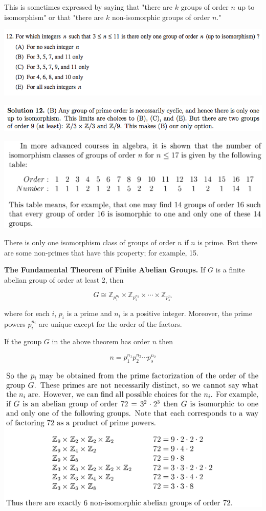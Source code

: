 \documentclass{article}
\begin{document}
This is sometimes expressed by saying that "there are \(k\) groups of order \(n\) up to isomorphism" or that "there are \(k\) non-isomorphic groups of order \(n\)."

\includegraphics[scale=0.65]{1268_12}

\includegraphics[scale=0.65]{1268_12s}

\includegraphics[scale=0.45]{isomorphism_groups_order}

There is only one isomorphism class of groups of order \(n\) if \(n\) is prime. But there are some non-primes that have this property; for example, 15.

\textbf{The Fundamental Theorem of Finite Abelian Groups.} If \(G\) is a finite abelian group of order at least 2, then 

\[
G \cong \mathbb{Z}_{p_1^{n_1}} \times \mathbb{Z}_{p_2^{n_2}} \times \cdots \times \mathbb{Z}_{p_s^{n_s}} 
\]

where for each \(i\), \(p_i\) is a prime and \(n_i\) is a positive integer. Moreover, the prime powers \(p_i^{n_i}\) are unique except for the order of the factors.

If the group \(G\) in the above theorem has order \(n\) then

\[
n = p_1^{n_1}p_2^{n_2} \cdots p_s^{n_2}
\]

\includegraphics[scale=0.45]{isomorphism_groups_order2}
\end{document}
